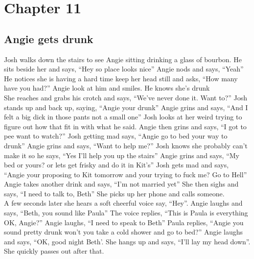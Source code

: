\documentclass{article}[12px]
\begin{document}
\section*{Chapter 11}
\subsection* {Angie gets drunk}
	Josh walks down the stairs to see Angie sitting drinking a glass of bourbon. He sits beside her and says, ``Hey so place looks nice'' Angie nods and says, ``Yeah'' He notices she is having a hard time keep her head still and asks, ``How many have you had?'' Angie look at him and smiles. He knows she's drunk\\
	
	She reaches and grabs his crotch and says, ``We've never done it. Want to?'' Josh stands up and back up, saying, ``Angie your drunk'' Angie grins and says, ``And I felt a big dick in those pants not a small one'' Josh looks at her weird trying to figure out how that fit in with what he said. Angie then grins and says, ``I got to pee want to watch?'' Josh getting mad says, ``Angie go to bed your way to drunk'' Angie grins and says, ``Want to help me?'' Josh knows she probably can't make it so he says, ``Yes I'll help you up the stairs'' Angie grins and says, ``My bed or yours? or lets get frisky and do it in Kit's'' Josh gets mad and says, ``Angie your proposing to Kit tomorrow and your trying to fuck me? Go to Hell''\\ 
	
	Angie takes another drink and says, ``I'm not married yet''  She then sighs and says, ``I need to talk to, Beth'' She picks up her phone and calls someone. \\
	
	A few seconds later she hears a soft cheerful voice say, ``Hey''. Angie laughs and says, ``Beth, you sound like Paula'' The voice replies, ``This is Paula is everything OK, Angie?'' Angie laughs, ``I need to speak to Beth'' Paula replies, ``Angie you sound pretty drunk won't you take a cold shower and go to bed?'' Angie laughs and says, ``OK, good night Beth'. She hangs up and says, ``I'll lay my head down''. She quickly passes out after that.\\
	
\end{document}
